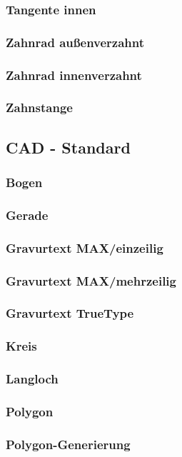 \documentclass[a4paper]{book}
\begin{document}
			\subsubsection{Tangente innen}
			\subsubsection{Zahnrad außenverzahnt}
			\subsubsection{Zahnrad innenverzahnt}
			\subsubsection{Zahnstange}
		\subsection{CAD - Standard}
			\subsubsection{Bogen} 
			\subsubsection{Gerade}
			\subsubsection{Gravurtext MAX/einzeilig} 
			\subsubsection{Gravurtext MAX/mehrzeilig}
			\subsubsection{Gravurtext TrueType} 
			\subsubsection{Kreis} 
			\subsubsection{Langloch} 
			\subsubsection{Polygon} 
			\subsubsection{Polygon-Generierung} 
\end{document}
